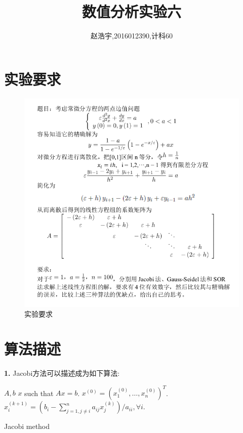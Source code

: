 \documentclass{article}
\title{\bf\huge 数值分析实验六}
\author{赵浩宇,2016012390,计科60}
\theoremstyle{plain}
\theoremstyle{definition}
\theoremstyle{remark}
\begin{document}
    
    \maketitle
    
    \section{实验要求}
    \begin{figure}[!h]
        \centering
        \includegraphics[width=5.5in]{problem.png}
        \caption{实验要求}
        \label{problem}
    \end{figure}
    
    \section{算法描述}
    \textbf{1.} Jacobi方法可以描述成为如下算法:
    \begin{algorithm}[!h]
        \centering
        \begin{algorithmic}[1]
            \Require $A,b$
            \Ensure $x$ such that $Ax = b$.
                \State $x^{(0)} = (x_1^{(0)},\dots,x_n^{(0)})^T$.
                    \State $x_i^{(k+1)} = (b_i - \sum_{j=1,j\neq i}^na_{ij}x_j^{(k)})/a_{ii},\forall i$.
                \EndFor
            \EndProcedure
        \end{algorithmic}
        \caption{Jacobi method}
        \label{jacobi}
    \end{algorithm}
    
\end{document}
